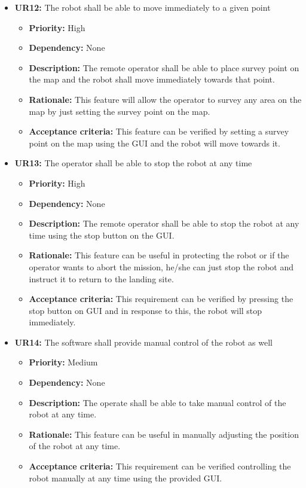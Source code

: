 \documentclass[10pt,a4paper,titlepage]{article}
\begin{document}
    \begin{itemize}
		\item \textbf{UR12:} The robot shall be able to move immediately to a given point
		\begin{itemize}
			\item \textbf{Priority:} High
            \item \textbf{Dependency:} None
			\item \textbf{Description:} The remote operator shall be able to place survey point on the map and the robot shall move immediately towards that point. 
            \item \textbf{Rationale:}  This feature will allow the operator to survey any area on the map by just setting the survey point on the map.
            \item \textbf{Acceptance criteria:}  This feature can be verified by setting a survey point on the map using the GUI and the robot will move towards it. 
		\end{itemize} 
	\end{itemize}
    \begin{itemize}
		\item \textbf{UR13:} The operator shall be able to stop the robot at any time
		\begin{itemize}
			\item \textbf{Priority:} High
            \item \textbf{Dependency:} None
			\item \textbf{Description:} The remote operator shall be able to stop the robot at any time using the stop button on the GUI.
            \item \textbf{Rationale:} This feature can be useful in protecting the robot or if the operator wants to abort the mission, he/she can just stop the robot and instruct it to return to the landing site.  
            \item \textbf{Acceptance criteria:} This requirement can be verified by pressing the stop button on GUI and in response to this, the robot will stop immediately. 
		\end{itemize} 
	\end{itemize} 
     \begin{itemize}
		\item \textbf{UR14:} The software shall provide manual control of the robot as well
		\begin{itemize}
			\item \textbf{Priority:} Medium
            \item \textbf{Dependency:} None
			\item \textbf{Description:}  The operate shall be able to take manual control of the robot at any time.   
            \item \textbf{Rationale:} This feature can be useful in manually adjusting the position of the robot at any time. 
            \item \textbf{Acceptance criteria:} This requirement can be verified controlling the robot manually at any time using the provided GUI. 
		\end{itemize} 
	\end{itemize}
\end{document}
